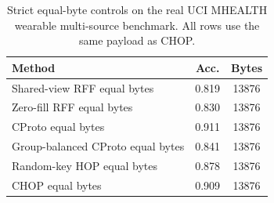 \begin{table}[t]
\centering
\caption{Strict equal-byte controls on the real UCI MHEALTH wearable multi-source benchmark. All rows use the same payload as CHOP.}
\label{tab:strict-equal-byte-mhealth}
\begin{tabular}{lcc}
\toprule
Method & Acc. & Bytes \\
\midrule
Shared-view RFF equal bytes & 0.819 & 13876 \\
Zero-fill RFF equal bytes & 0.830 & 13876 \\
CProto equal bytes & 0.911 & 13876 \\
Group-balanced CProto equal bytes & 0.841 & 13876 \\
Random-key HOP equal bytes & 0.878 & 13876 \\
CHOP equal bytes & 0.909 & 13876 \\
\bottomrule
\end{tabular}
\end{table}

